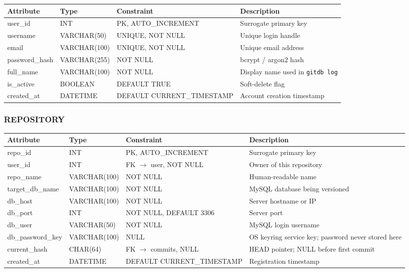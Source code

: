 \documentclass[12pt, a4paper]{article}
\begin{document}
\begin{center}
\renewcommand{\arraystretch}{1.3}
\begin{tabular}{>{\ttfamily}l >{\ttfamily}l l p{5cm}}
\toprule
\textbf{Attribute} & \textbf{Type} & \textbf{Constraint} & \textbf{Description} \\
\midrule
user\_id       & INT          & PK, AUTO\_INCREMENT  & Surrogate primary key \\
username       & VARCHAR(50)  & UNIQUE, NOT NULL     & Unique login handle \\
email          & VARCHAR(100) & UNIQUE, NOT NULL     & Unique email address \\
password\_hash & VARCHAR(255) & NOT NULL             & bcrypt / argon2 hash \\
full\_name     & VARCHAR(100) & NOT NULL             & Display name used in \texttt{gitdb log} \\
is\_active     & BOOLEAN      & DEFAULT TRUE         & Soft-delete flag \\
created\_at    & DATETIME     & DEFAULT CURRENT\_TIMESTAMP & Account creation timestamp \\
\bottomrule
\end{tabular}
\end{center}

\subsubsection{REPOSITORY}

\begin{center}
\renewcommand{\arraystretch}{1.3}
\begin{tabular}{>{\ttfamily}l >{\ttfamily}l l p{4.5cm}}
\toprule
\textbf{Attribute} & \textbf{Type} & \textbf{Constraint} & \textbf{Description} \\
\midrule
repo\_id         & INT          & PK, AUTO\_INCREMENT       & Surrogate primary key \\
user\_id         & INT          & FK $\to$ user, NOT NULL   & Owner of this repository \\
repo\_name       & VARCHAR(100) & NOT NULL                  & Human-readable name \\
target\_db\_name & VARCHAR(100) & NOT NULL                  & MySQL database being versioned \\
db\_host         & VARCHAR(100) & NOT NULL                  & Server hostname or IP \\
db\_port         & INT          & NOT NULL, DEFAULT 3306    & Server port \\
db\_user         & VARCHAR(50)  & NOT NULL                  & MySQL login username \\
db\_password\_key & VARCHAR(100) & NULL                      & OS keyring service key; password never stored here \\
current\_hash    & CHAR(64)     & FK $\to$ commits, NULL    & HEAD pointer; NULL before first commit \\
created\_at      & DATETIME     & DEFAULT CURRENT\_TIMESTAMP & Registration timestamp \\
\bottomrule
\end{tabular}
\end{center}
\end{document}
